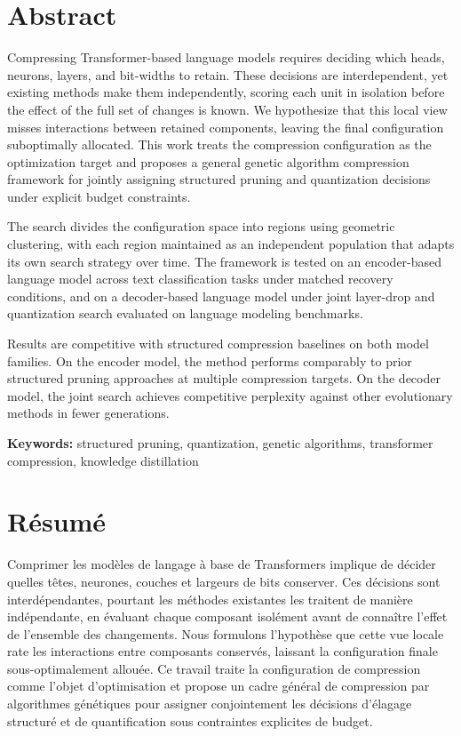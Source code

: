 \chapter*{Abstract}

Compressing Transformer-based language models requires deciding which heads, neurons, layers, and bit-widths to retain. These decisions are interdependent, yet existing methods make them independently, scoring each unit in isolation before the effect of the full set of changes is known. We hypothesize that this local view misses interactions between retained components, leaving the final configuration suboptimally allocated. This work treats the compression configuration as the optimization target and proposes a general genetic algorithm compression framework for jointly assigning structured pruning and quantization decisions under explicit budget constraints.

The search divides the configuration space into regions using geometric clustering, with each region maintained as an independent population that adapts its own search strategy over time. The framework is tested on an encoder-based language model across text classification tasks under matched recovery conditions, and on a decoder-based language model under joint layer-drop and quantization search evaluated on language modeling benchmarks.

Results are competitive with structured compression baselines on both model families. On the encoder model, the method performs comparably to prior structured pruning approaches at multiple compression targets. On the decoder model, the joint search achieves competitive perplexity against other evolutionary methods in fewer generations.

\vspace{1em}
\noindent\textbf{Keywords:} structured pruning, quantization, genetic algorithms, transformer compression, knowledge distillation

\clearpage

\chapter*{Résumé}

Comprimer les modèles de langage à base de Transformers implique de décider quelles têtes, neurones, couches et largeurs de bits conserver. Ces décisions sont interdépendantes, pourtant les méthodes existantes les traitent de manière indépendante, en évaluant chaque composant isolément avant de connaître l'effet de l'ensemble des changements. Nous formulons l'hypothèse que cette vue locale rate les interactions entre composants conservés, laissant la configuration finale sous-optimalement allouée. Ce travail traite la configuration de compression comme l'objet d'optimisation et propose un cadre général de compression par algorithmes génétiques pour assigner conjointement les décisions d'élagage structuré et de quantification sous contraintes explicites de budget.

